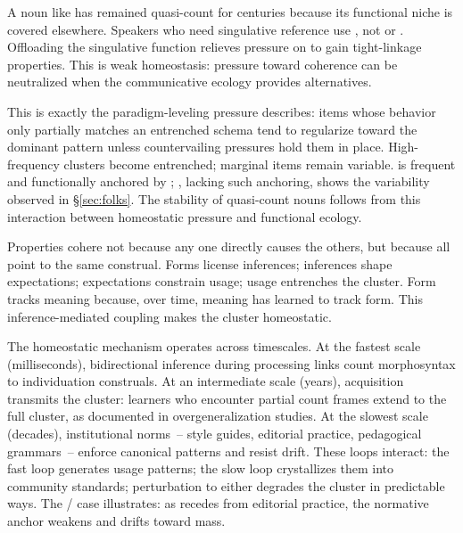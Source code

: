 \documentclass[12pt,a4paper]{article}
\begin{document}
A noun like  has remained quasi-count for centuries because its functional niche is covered elsewhere. Speakers who need singulative reference use , not  or . Offloading the singulative function relieves pressure on  to gain tight-linkage properties. This is weak homeostasis: pressure toward coherence can be neutralized when the communicative ecology provides alternatives.

This is exactly the paradigm-leveling pressure \textcite{bybee2010} describes: items whose behavior only partially matches an entrenched schema tend to regularize toward the dominant pattern unless countervailing pressures hold them in place. High-frequency clusters become entrenched; marginal items remain variable.  is frequent and functionally anchored by ; , lacking such anchoring, shows the variability observed in \S\ref{sec:folks}. The stability of quasi-count nouns follows from this interaction between homeostatic pressure and functional ecology.

Properties cohere not because any one directly causes the others, but because all point to the same construal. Forms license inferences; inferences shape expectations; expectations constrain usage; usage entrenches the cluster. Form tracks meaning because, over time, meaning has learned to track form. This inference-mediated coupling makes the cluster homeostatic.

The homeostatic mechanism operates across timescales. At the fastest scale (milliseconds), bidirectional inference during processing links count morphosyntax to individuation construals. At an intermediate scale (years), acquisition transmits the cluster: learners who encounter partial count frames extend to the full cluster, as documented in overgeneralization studies. At the slowest scale (decades), institutional norms~-- style guides, editorial practice, pedagogical grammars~-- enforce canonical patterns and resist drift. These loops interact: the fast loop generates usage patterns; the slow loop crystallizes them into community standards; perturbation to either degrades the cluster in predictable ways. The / case illustrates: as  recedes from editorial practice, the normative anchor weakens and  drifts toward mass.
\end{document}
